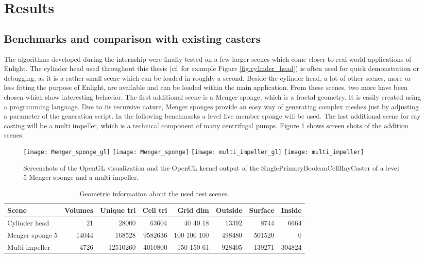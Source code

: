 \section{Results}
\label{sec:results}


\subsection{Benchmarks and comparison with existing casters}

The algorithms developed during the internship were finally tested on a few larger scenes which come closer to real world applications of Enlight. The cylinder head used throughout this thesis (cf. for example Figure \ref{fig:cylinder_head}) is often used for quick demonstration or debugging, as it is a rather small scene which can be loaded in roughly a second. Beside the cylinder head, a lot of other scenes, more or less fitting the purpose of Enlight, are available and can be loaded within the main application. From these scenes, two more have been chosen which show interesting behavior. The first additional scene is a Menger sponge, which is a fractal geometry. It is easily created using a programming language. Due to its recursive nature, Menger sponges provide an easy way of generating complex meshes just by adjusting a parameter of the generation script. In the following benchmarks a level five member sponge will be used. The last additional scene for ray casting will be a multi impeller, which is a technical component of many centrifugal pumps. Figure \ref{fig:Menger_sponge_multi_impeller} shows screen shots of the addition scenes.

\begin{figure}
\centering
\texttt{[image: Menger\_sponge\_gl]}
\texttt{[image: Menger\_sponge]}
\texttt{[image: multi\_impeller\_gl]}
\texttt{[image: multi\_impeller]}
\caption{Screenshots of the OpenGL visualization and the OpenCL kernel output of the SinglePrimaryBooleanCellRayCaster of a level 5 Menger sponge and a multi impeller.}
\label{fig:Menger_sponge_multi_impeller}
\end{figure}

\begin{table}[h]
\centering
\begin{tabular}{|l | r r r r r r r|}
\hline
Scene & Volumes & Unique tri & Cell tri & Grid dim & Outside & Surface & Inside \\
\hline
Cylinder head & 21 & 28000 & 63604 & 40 40 18 & 13392 & 8744 & 6664 \\
Menger sponge 5 & 14044 & 168528 & 9582636 & 100 100 100 & 498480 & 501520 & 0 \\
Multi impeller & 4726 & 12510260 & 4010800 & 150 150 61 & 928405 & 139271 & 304824 \\
\hline
\end{tabular}
\caption{Geometric information about the used test scenes.}
\label{tbl:geometrics}
\end{table}

